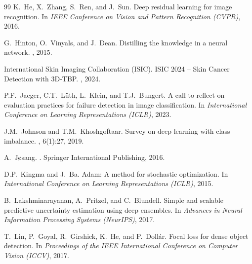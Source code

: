 \documentclass[letterpaper]{article} %
\begin{document}
\begin{thebibliography}{99}
K.~He, X.~Zhang, S.~Ren, and J.~Sun.
\newblock Deep residual learning for image recognition.
\newblock In {\em IEEE Conference on Vision and Pattern Recognition (CVPR)}, 2016.

G.~Hinton, O.~Vinyals, and J.~Dean.
\newblock Distilling the knowledge in a neural network.
, 2015.

International Skin Imaging Collaboration (ISIC).
\newblock ISIC 2024 -- Skin Cancer Detection with 3D-TBP.
, 2024.

P.F.~Jaeger, C.T.~L\"uth, L.~Klein, and T.J.~Bungert.
\newblock A call to reflect on evaluation practices for failure detection in image classification.
\newblock In {\em International Conference on Learning Representations (ICLR)}, 2023.

J.M.~Johnson and T.M.~Khoshgoftaar.
\newblock Survey on deep learning with class imbalance.
, 6(1):27, 2019.

A.~J{\o}sang.
.
\newblock Springer International Publishing, 2016.

D.P.~Kingma and J.~Ba.
\newblock Adam: A method for stochastic optimization.
\newblock In {\em International Conference on Learning Representations (ICLR)}, 2015.

B.~Lakshminarayanan, A.~Pritzel, and C.~Blundell.
\newblock Simple and scalable predictive uncertainty estimation using deep ensembles.
\newblock In {\em Advances in Neural Information Processing Systems (NeurIPS)}, 2017.

T.~Lin, P.~Goyal, R.~Girshick, K.~He, and P.~Doll{\'a}r.
\newblock Focal loss for dense object detection.
\newblock In {\em Proceedings of the IEEE International Conference on Computer Vision (ICCV)}, 2017.


\end{thebibliography}
\end{document}
